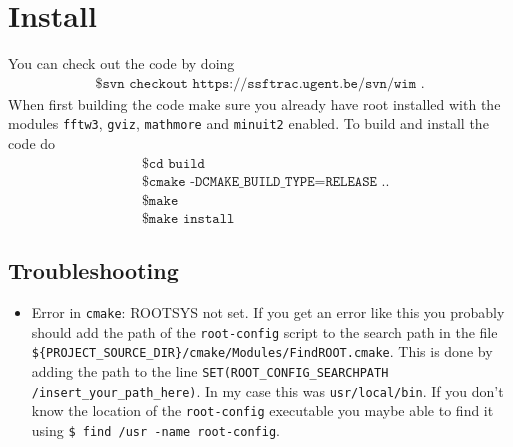 \section{Install}
You can check out the code by doing
\begin{align*}
	\texttt{\$ svn checkout https://ssftrac.ugent.be/svn/wim .}
\end{align*}
When first building the code make sure you already have root installed with the modules \texttt{fftw3}, \texttt{gviz}, \texttt{mathmore} and \texttt{minuit2} enabled. To build and install the code do
\begin{align*}
    & \texttt{\$ cd build} \\
	& \texttt{\$ cmake -DCMAKE\_BUILD\_TYPE=RELEASE ..} \\
	& \texttt{\$ make } \\
	& \texttt{\$ make install } 
\end{align*}
\subsection{Troubleshooting}
\begin{itemize}
\item Error in \texttt{cmake}: ROOTSYS not set.
If you get an error like this you probably should add the path of the \texttt{root-config} script to the search path in the file \texttt{\$\{PROJECT\_SOURCE\_DIR\}/cmake/Modules/FindROOT.cmake}. This is done by adding the path to the line \texttt{SET(ROOT\_CONFIG\_SEARCHPATH /insert\_your\_path\_here)}. In my case this was \texttt{usr/local/bin}. If you don't know the location of the \texttt{root-config} executable you maybe able to find it using \texttt{\$ find /usr -name root-config}.

\end{itemize}